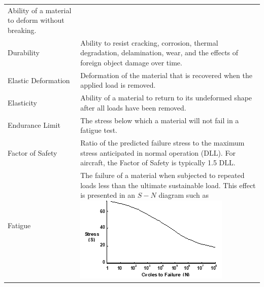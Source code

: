 \documentclass[
]{book}
\begin{document}
\begin{longtable}[]{@{}ll@{}}
\begin{minipage}[t]{0.80\columnwidth}
Ability of a material to deform without breaking.\strut
\end{minipage}\tabularnewline
\begin{minipage}[t]{0.14\columnwidth}\raggedright
Durability\strut
\end{minipage} & \begin{minipage}[t]{0.80\columnwidth}\raggedright
Ability to resist cracking, corrosion, thermal degradation, delamination, wear, and the effects of foreign object damage over time.\strut
\end{minipage}\tabularnewline
\begin{minipage}[t]{0.14\columnwidth}\raggedright
Elastic Deformation\strut
\end{minipage} & \begin{minipage}[t]{0.80\columnwidth}\raggedright
Deformation of the material that is recovered when the applied load is removed.\strut
\end{minipage}\tabularnewline
\begin{minipage}[t]{0.14\columnwidth}\raggedright
Elasticity\strut
\end{minipage} & \begin{minipage}[t]{0.80\columnwidth}\raggedright
Ability of a material to return to its undeformed shape after all loads have been removed.\strut
\end{minipage}\tabularnewline
\begin{minipage}[t]{0.14\columnwidth}\raggedright
Endurance Limit\strut
\end{minipage} & \begin{minipage}[t]{0.80\columnwidth}\raggedright
The stress below which a material will not fail in a fatigue test.\strut
\end{minipage}\tabularnewline
\begin{minipage}[t]{0.14\columnwidth}\raggedright
Factor of Safety\strut
\end{minipage} & \begin{minipage}[t]{0.80\columnwidth}\raggedright
Ratio of the predicted failure stress to the maximum stress anticipated in normal operation (\(\mathrm{DLL}\)). For aircraft, the Factor of Safety is typically 1.5 \(\mathrm{DLL}\).\strut
\end{minipage}\tabularnewline
\begin{minipage}[t]{0.14\columnwidth}\raggedright
Fatigue\strut
\end{minipage} & \begin{minipage}[t]{0.80\columnwidth}\raggedright
The failure of a material when subjected to repeated loads less than the ultimate sustainable load. This effect is presented in an \(S-N\) diagram such as \includegraphics[width=2.90556in,height=1.60417in]{media/09/image1.png}\strut

\end{minipage}
\end{longtable}
\end{document}
